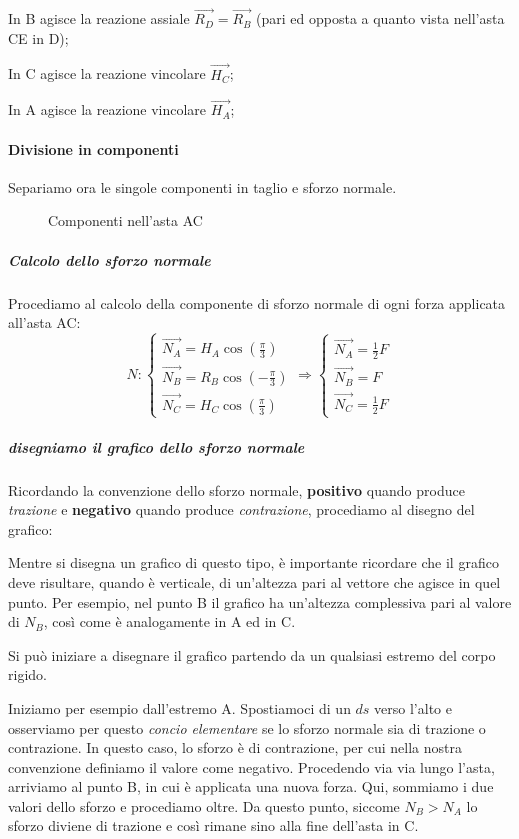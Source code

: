 \documentclass[main.tex]{subfiles}
\begin{document}
In B agisce la reazione assiale $\vec{R_D} = \vec{R_B}$ (pari ed opposta a quanto vista nell'asta CE in D);

In C agisce la reazione vincolare $\vec{H_C}$;

In A agisce la reazione vincolare $\vec{H_A}$;



\paragraph{Divisione in componenti}
Separiamo ora le singole componenti in taglio e sforzo normale.

\begin{figure}[htb]
\centering
\resizebox{.5\textwidth}{!}{}
\caption{Componenti nell'asta AC}
\label{separated_components_1}
\end{figure}

\subparagraph{Calcolo dello sforzo normale}
Procediamo al calcolo della componente di sforzo normale di ogni forza applicata all'asta AC:
\[
	N: \begin{cases}
		\vec{N_A} = H_A\cos(\frac{\pi}{3})\\
		\vec{N_B} = R_B\cos(-\frac{\pi}{3})\\
		\vec{N_C} = H_C\cos(\frac{\pi}{3})
	\end{cases}
	\Longrightarrow
	\begin{cases}
		\vec{N_A} = \frac{1}{2}F\\
		\vec{N_B} = F\\
		\vec{N_C} = \frac{1}{2}F
	\end{cases}
\]

\subparagraph{disegniamo il grafico dello sforzo normale}
Ricordando la convenzione dello sforzo normale, \textbf{positivo} quando produce \textit{trazione} e \textbf{negativo} quando produce \textit{contrazione},  procediamo al disegno del grafico:

Mentre si disegna un grafico di questo tipo, è importante ricordare che il grafico deve risultare, quando è verticale, di un'altezza pari al vettore che agisce in quel punto. Per esempio, nel punto B il grafico ha un'altezza complessiva pari al valore di $N_B$, così come è analogamente in A ed in C.

Si può iniziare a disegnare il grafico partendo da un qualsiasi estremo del corpo rigido.

Iniziamo per esempio dall'estremo A. Spostiamoci di un $ds$ verso l'alto e osserviamo per questo \textit{concio elementare} se lo sforzo normale sia di trazione o contrazione. In questo caso, lo sforzo è di contrazione, per cui nella nostra convenzione definiamo il valore come negativo. Procedendo via via lungo l'asta, arriviamo al punto B, in cui è applicata una nuova forza. Qui, sommiamo i due valori dello sforzo e procediamo oltre. Da questo punto, siccome $N_B>N_A$ lo sforzo diviene di trazione e così rimane sino alla fine dell'asta in C.
\end{document}
